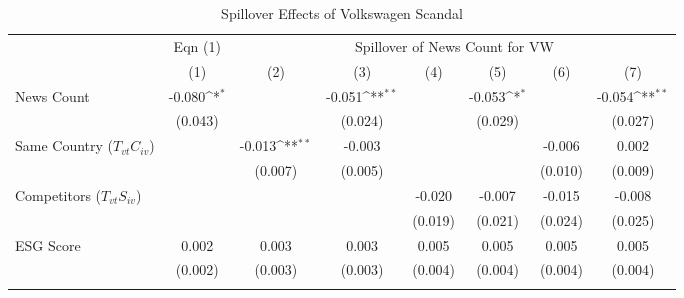 \begin{table}[htbp]\centering
\def\sym#1{\ifmmode^{#1}\else\(^{#1}\)\fi}
\caption{Spillover Effects of Volkswagen Scandal}
\begin{tabular}{l*{7}{c}}
\toprule
                    &\multicolumn{1}{c}{Eqn (1)}&\multicolumn{6}{c}{Spillover of News Count for VW}                                                                                 \\\cmidrule(lr){2-2}\cmidrule(lr){3-8}
                    &\multicolumn{1}{c}{(1)}         &\multicolumn{1}{c}{(2)}         &\multicolumn{1}{c}{(3)}         &\multicolumn{1}{c}{(4)}         &\multicolumn{1}{c}{(5)}         &\multicolumn{1}{c}{(6)}         &\multicolumn{1}{c}{(7)}         \\
\midrule
News Count          &      -0.080\sym{*}  &                     &      -0.051\sym{**} &                     &      -0.053\sym{*}  &                     &      -0.054\sym{**} \\
                    &     (0.043)         &                     &     (0.024)         &                     &     (0.029)         &                     &     (0.027)         \\
\addlinespace
Same Country ($ T_{vt} C_{iv}$)&                     &      -0.013\sym{**} &      -0.003         &                     &                     &      -0.006         &       0.002         \\
                    &                     &     (0.007)         &     (0.005)         &                     &                     &     (0.010)         &     (0.009)         \\
\addlinespace
Competitors ($ T_{vt} S_{iv}$)&                     &                     &                     &      -0.020         &      -0.007         &      -0.015         &      -0.008         \\
                    &                     &                     &                     &     (0.019)         &     (0.021)         &     (0.024)         &     (0.025)         \\
\addlinespace
ESG Score           &       0.002         &       0.003         &       0.003         &       0.005         &       0.005         &       0.005         &       0.005         \\
                    &     (0.002)         &     (0.003)         &     (0.003)         &     (0.004)         &     (0.004)         &     (0.004)         &     (0.004)         \\
\addlinespace

\end{tabular}
\end{table}
